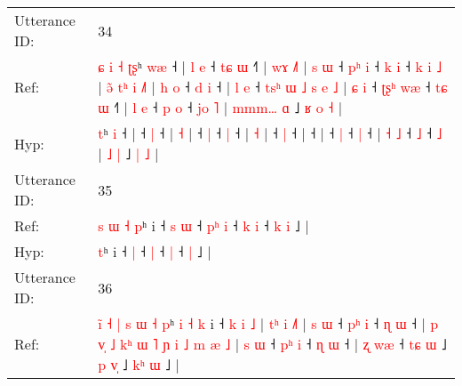 \documentclass[10pt]{article}
\DeclareRobustCommand{\hl}[1]{{\textcolor{red}{#1}}}
\begin{document}
\begin{longtable}{ll}
 \\
\midrule
Utterance ID: & 34 \\
Ref: & \hl{ɕ}\hl{ }\hl{i}\hl{ }\hl{˧}\hl{ }\hl{ʈ}\hl{ʂ}ʰ \hl{w}\hl{æ} ˧ |\hl{ }\hl{l}\hl{ }\hl{e} ˧\hl{ }\hl{t}\hl{ɕ} \hl{ɯ} ˧\hl{˥} |\hl{ }\hl{w}\hl{ɤ} \hl{˩}\hl{˥} |\hl{ }\hl{s}\hl{ }\hl{ɯ} ˧\hl{ }\hl{p}\hl{ʰ} \hl{i} ˧\hl{ }\hl{k} \hl{i} ˧\hl{ }\hl{k}\hl{ }\hl{i}\hl{ }\hl{˩} |\hl{ }\hl{ə}\hl{̃}\hl{ }\hl{t}\hl{ʰ}\hl{ }\hl{i} \hl{˩}\hl{˥} |\hl{ }\hl{h}\hl{ }\hl{o} ˧\hl{ }\hl{d} \hl{i} ˧ |\hl{ }\hl{l}\hl{ }\hl{e} ˧\hl{ }\hl{t}\hl{s}\hl{ʰ}\hl{ }\hl{ɯ}\hl{ }\hl{˩}\hl{ }\hl{s}\hl{ }\hl{e}\hl{ }\hl{˩} |\hl{ }\hl{ɕ}\hl{ }\hl{i} ˧\hl{ }\hl{ʈ}\hl{ʂ}\hl{ʰ} \hl{w}\hl{æ} ˧\hl{ }\hl{t}\hl{ɕ} \hl{ɯ} ˧\hl{˥} | \hl{l} \hl{e} ˧\hl{ }\hl{p} \hl{o} ˧\hl{ }\hl{j}\hl{o} \hl{˥} | \hl{m}\hl{m}\hl{m}\hl{…} \hl{ɑ} ˩\hl{ }\hl{ʁ} \hl{o} \hl{˧} |
 \\
Hyp: & \hl{}\hl{}\hl{}\hl{}\hl{}\hl{}\hl{}\hl{t}ʰ \hl{}\hl{i} ˧ |\hl{}\hl{}\hl{}\hl{} ˧\hl{}\hl{}\hl{} \hl{|} ˧\hl{} |\hl{}\hl{}\hl{} \hl{}\hl{˧} |\hl{}\hl{}\hl{}\hl{} ˧\hl{}\hl{}\hl{} \hl{|} ˧\hl{}\hl{} \hl{|} ˧\hl{}\hl{}\hl{}\hl{}\hl{}\hl{} |\hl{}\hl{}\hl{}\hl{}\hl{}\hl{}\hl{}\hl{} \hl{}\hl{˧} |\hl{}\hl{}\hl{}\hl{} ˧\hl{}\hl{} \hl{|} ˧ |\hl{}\hl{}\hl{}\hl{} ˧\hl{}\hl{}\hl{}\hl{}\hl{}\hl{}\hl{}\hl{}\hl{}\hl{}\hl{}\hl{}\hl{}\hl{} |\hl{}\hl{}\hl{}\hl{} ˧\hl{}\hl{}\hl{}\hl{} \hl{}\hl{|} ˧\hl{}\hl{}\hl{} \hl{|} ˧\hl{} | \hl{˧} \hl{˩} ˧\hl{}\hl{} \hl{˩} ˧\hl{}\hl{}\hl{} \hl{˩} | \hl{}\hl{}\hl{}\hl{˩} \hl{|} ˩\hl{}\hl{} \hl{|} \hl{˩} |
 \\
\midrule
Utterance ID: & 35 \\
Ref: & \hl{s}\hl{ }\hl{ɯ}\hl{ }\hl{˧}\hl{ }\hl{p}ʰ i ˧\hl{ }\hl{s} \hl{ɯ} ˧\hl{ }\hl{p}\hl{ʰ} \hl{i} ˧\hl{ }\hl{k} \hl{i} ˧\hl{ }\hl{k} \hl{i} ˩ |
 \\
Hyp: & \hl{}\hl{}\hl{}\hl{}\hl{}\hl{}\hl{t}ʰ i ˧\hl{}\hl{} \hl{|} ˧\hl{}\hl{}\hl{} \hl{|} ˧\hl{}\hl{} \hl{|} ˧\hl{}\hl{} \hl{|} ˩ |
 \\
\midrule
Utterance ID: & 36 \\
Ref: & \hl{i}\hl{̃}\hl{ }\hl{˧}\hl{ }\hl{|}\hl{ }\hl{s}\hl{ }\hl{ɯ}\hl{ }\hl{˧}\hl{ }\hl{p}ʰ\hl{ }\hl{i}\hl{ }\hl{˧}\hl{ }\hl{k} i ˧\hl{ }\hl{k}\hl{ }\hl{i}\hl{ }\hl{˩} |\hl{ }\hl{t}\hl{ʰ}\hl{ }\hl{i} \hl{˩}\hl{˥} |\hl{ }\hl{s}\hl{ }\hl{ɯ} ˧\hl{ }\hl{p}\hl{ʰ} \hl{i} ˧\hl{ }\hl{ɳ} \hl{ɯ} ˧ |\hl{ }\hl{p}\hl{ }\hl{v}\hl{̩}\hl{ }\hl{˩}\hl{ }\hl{k}\hl{ʰ}\hl{ }\hl{ɯ}\hl{ }\hl{˥}\hl{ }\hl{ɲ}\hl{ }\hl{i}\hl{ }\hl{˩}\hl{ }\hl{m}\hl{ }\hl{æ} \hl{˩} |\hl{ }\hl{s}\hl{ }\hl{ɯ} ˧\hl{ }\hl{p}\hl{ʰ} \hl{i} ˧\hl{ }\hl{ɳ} \hl{ɯ} ˧ | \hl{ʐ} \hl{w}\hl{æ} ˧ \hl{t}\hl{ɕ} \hl{ɯ} ˩\hl{ }\hl{p} \hl{v}\hl{̩} ˩\hl{ }\hl{k}\hl{ʰ} \hl{ɯ} ˩ |

\end{longtable}
\end{document}
